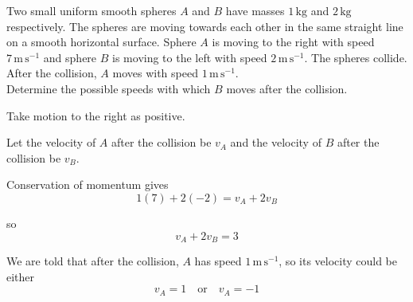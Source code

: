 \documentclass[leqno]{article}
\begin{document}
\djsFrontMatter
\begin{enumerate}[
  label=\textbf{\arabic*.},
  leftmargin=*,
  topsep=0pt,
  partopsep=0pt,
  parsep=0pt
]


\questionitem

\begin{figure}[H]
    \centering
{}
\end{figure}


Two small uniform smooth spheres $A$ and $B$ have masses $1\,\mathrm{kg}$ and $2\,\mathrm{kg}$ respectively. The spheres are moving towards each other in the same straight line on a smooth horizontal surface. Sphere $A$ is moving to the right with speed $7\,\mathrm{m\,s^{-1}}$ and sphere $B$ is moving to the left with speed $2\,\mathrm{m\,s^{-1}}$. The spheres collide. After the collision, $A$ moves with speed $1\,\mathrm{m\,s^{-1}}$. \\

Determine the possible speeds with which $B$ moves after the collision. 

\vspace*{10pt}

\begin{djsSolution}
Take motion to the right as positive.

Let the velocity of $A$ after the collision be $v_A$ and the velocity of $B$ after the collision be $v_B$.

Conservation of momentum gives
\[
1(7)+2(-2)=v_A+2v_B
\]

so
\[
v_A+2v_B=3
\]

We are told that after the collision, $A$ has speed $1\,\mathrm{m\,s^{-1}}$, so its velocity could be either
\[
v_A=1 \quad \text{or} \quad v_A=-1
\]


\end{djsSolution}
\end{enumerate}
\end{document}
